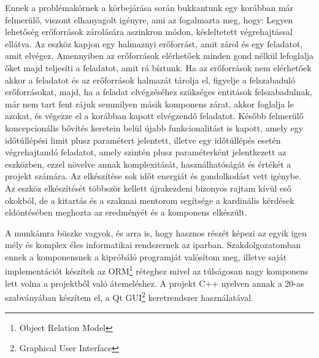 Ennek a problémakörnek a körbejárása során bukkantunk egy korábban már felmerülő, viszont elhanyagolt igényre, ami az fogalmazta meg, hogy: Legyen lehetőség erőforrások zárolására aszinkron módon, késleltetett végrehajtással ellátva. Az eszköz kapjon egy halmaznyi erőforrást, amit zárol és egy feladatot, amit elvégez. Amennyiben az erőforrások elérhetőek minden gond nélkül lefoglalja őket majd teljesíti a feladatot, amit rá bíztunk. Ha az erőforrások nem elérhetőek akkor a feladatot és az erőforrások halmazát tárolja el, figyelje a felszabaduló erőforrásokat, majd, ha a feladat elvégzéséhez szükséges entitások felszabadulnak, már nem tart fent rájuk semmilyen másik komponens zárat, akkor foglalja le azokat, és végezze el a korábban kapott elvégzendő feladatot. Később felmerülő koncepcionális bővítés keretein belül újabb funkcionalitást is kapott, amely egy időtúllépési limit plusz paramétert jelentett, illetve egy időtúllépés esetén végrehajtandó feladatot, amely szintén plusz paraméterként jelentkezett az eszközben, ezzel növelve annak komplexitását, használhatóságát és értékét a projekt számára. Az elkészítése sok időt energiát és gondolkodást vett igénybe. Az eszköz elkészítését többször kellett újrakezdeni bizonyos rajtam kívül eső okokból, de a kitartás és a szakmai mentorom segítsége a kardinális kérdések eldöntésében meghozta az eredményét és a komponens elkészült.

A munkámra büszke vagyok, és arra is, hogy hasznos részét képezi az egyik igen mély és komplex éles informatikai rendszernek az iparban. Szakdolgozatomban ennek a komponensnek a kipróbáló programját valósítom meg, illetve saját implementációt készítek az ORM\footnote {Object Relation Model} réteghez mivel az túlságosan nagy komponens lett volna a projektből való átemeléshez. A projekt C++ nyelven annak a 20-as szabványában készítem el, a Qt\cite{qt_docs} GUI\footnote {Graphical User Interface} keretrendszer használatával.